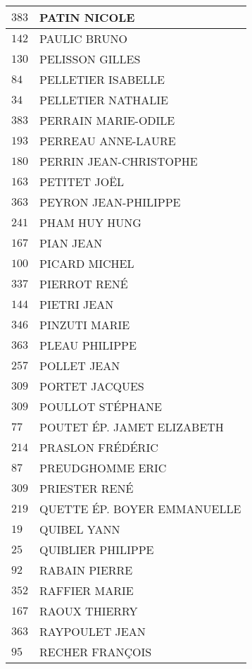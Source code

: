 \begin{xltabular}{\linewidth}{|l|X|}
    \hline
    $383$ & PATIN NICOLE \\
    \hline
    $142$ & PAULIC BRUNO \\
    \hline
    $130$ & PELISSON GILLES \\
    \hline
    $84$ & PELLETIER ISABELLE \\
    \hline
    $34$ & PELLETIER NATHALIE \\
    \hline
    $383$ & PERRAIN MARIE-ODILE \\
    \hline
    $193$ & PERREAU ANNE-LAURE \\
    \hline
    $180$ & PERRIN JEAN-CHRISTOPHE \\
    \hline
    $163$ & PETITET JOËL \\
    \hline
    $363$ & PEYRON JEAN-PHILIPPE \\
    \hline
    $241$ & PHAM HUY HUNG \\
    \hline
    $167$ & PIAN JEAN \\
    \hline
    $100$ & PICARD MICHEL \\
    \hline
    $337$ & PIERROT RENÉ \\
    \hline
    $144$ & PIETRI JEAN \\
    \hline
    $346$ & PINZUTI MARIE \\
    \hline
    $363$ & PLEAU PHILIPPE \\
    \hline
    $257$ & POLLET JEAN \\
    \hline
    $309$ & PORTET JACQUES \\
    \hline
    $309$ & POULLOT STÉPHANE \\
    \hline
    $77$ & POUTET ÉP. JAMET ELIZABETH \\
    \hline
    $214$ & PRASLON FRÉDÉRIC \\
    \hline
    $87$ & PREUDGHOMME ERIC \\
    \hline
    $309$ & PRIESTER RENÉ \\
    \hline
    $219$ & QUETTE ÉP. BOYER EMMANUELLE \\
    \hline
    $19$ & QUIBEL YANN \\
    \hline
    $25$ & QUIBLIER PHILIPPE \\
    \hline
    $92$ & RABAIN PIERRE \\
    \hline
    $352$ & RAFFIER MARIE \\
    \hline
    $167$ & RAOUX THIERRY \\
    \hline
    $363$ & RAYPOULET JEAN \\
    \hline
    $95$ & RECHER FRANÇOIS \\

\end{xltabular}
